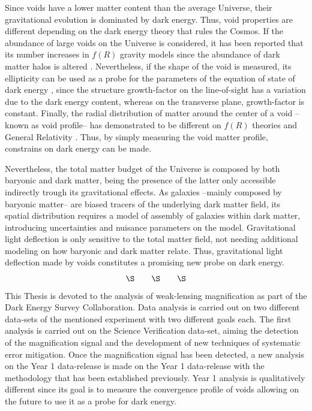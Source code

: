 Since voids have a lower matter content than the average Universe, their gravitational evolution is dominated by dark energy. Thus, void properties are different depending on the dark energy theory that rules the Cosmos. If the abundance of large voids on the Universe is considered, it has been reported that its number increases in $f(R)$ gravity models \cite{2012MNRAS.421.3481L} since the abundance of dark matter halos is altered \cite{2017JCAP...03..012V}. Nevertheless, if the shape of the void is measured, its ellipticity can be used as a probe for the parameters of the equation of state of dark energy \cite{2010MNRAS.403.1392L,0004-637X-754-2-109,PhysRevLett.98.081301,2013PhRvL.111x1103S}, since the structure growth-factor on the line-of-sight has a variation due to
the dark energy content, whereas on the transverse plane, growth-factor is constant. Finally, the radial distribution of matter around the center of a void --known as void profile-- has demonstrated to be different on $f(R)$ theories and General Relativity \cite{2014APh....54...44A,2014arXiv1410.8355C,2015MNRAS.451.4215Z,2015JCAP...08..028B,2016PhRvD..93j3522A,2016PhRvD..94j3524A}. Thus, by simply measuring the void matter profile, constrains on dark energy can be made.
\newline

Nevertheless, the total matter budget of the Universe is composed by both baryonic and dark matter, being the presence of the latter only accessible indirectly trough its gravitational effects. As galaxies --mainly composed by baryonic matter-- are biased tracers of the underlying dark matter field, its spatial distribution requires a model of assembly of galaxies within dark matter, introducing uncertainties and nuisance parameters on the model. Gravitational light deflection is only sensitive to the total matter field, not needing additional modeling on how baryonic and dark matter relate. Thus, gravitational light deflection made by voids constitutes a promising new probe on dark energy.
$$\S\qquad \S\qquad \S$$
This Thesis is devoted to the analysis of weak-lensing magnification as part of the Dark Energy Survey Collaboration. Data analysis is carried out on two different data-sets of the mentioned experiment with two different goals each. The first analysis is carried out on the Science Verification data-set, aiming the detection of the magnification signal and the development of new techniques of systematic error mitigation. Once the magnification signal has been detected, a new analysis on the Year 1 data-release is made on the Year 1 data-release with the methodology that has been established previously. Year 1 analysis is qualitatively different since its goal is to measure the convergence profile of voids allowing on the future to use it as a probe for dark energy.
\newline

